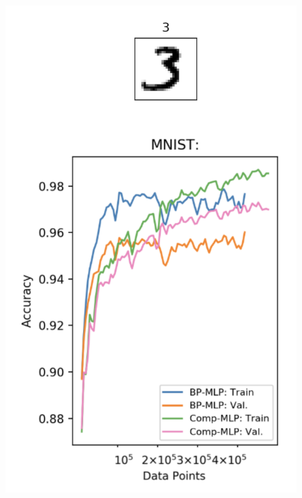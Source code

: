 \documentclass[dvipsnames, usenames]{beamer}
\begin{document}

\begin{frame}
	\begin{figure}
		\centering
		\includegraphics[height=\textheight]{../figures/report/p1_1}
	\end{figure}
\end{frame}

\end{document}
